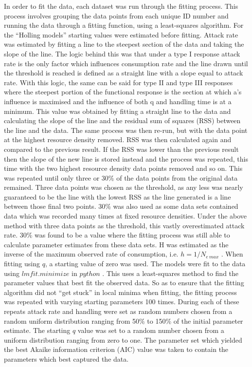 \documentclass[a4paper]{article}
\numberwithin{equation}{section}
\begin{document}
\newline
In order to fit the data, each dataset was run through the fitting process.  This process involves grouping the data points from each unique ID number and running the data through a fitting function, using a least-squares algorithm.  For the “Holling models” starting values were estimated before fitting. 
\newline 
Attack rate was estimated by fitting a line to the steepest section of the data and taking the slope of the line.  The logic behind this was that under a type I response attack rate is the only factor which influences consumption rate and the line drawn until the threshold is reached is defined as a straight line with a slope equal to attack rate.  With this logic, the same can be said for type II and type III responses where the steepest portion of the functional response is the section at which a’s influence is maximised and the influence of both q and handling time is at a minimum.  This value was obtained by fitting a straight line to the data and calculating the slope of the line and the residual sum of squares (RSS) between the line and the data.  The same process was then re-run, but with the data point at the highest resource density removed.  RSS was then calculated again and compared to the previous result.  If the RSS was lower than the previous result then the slope of the new line is stored instead and the process was repeated, this time with the two highest resource density data points removed and so on.  This was repeated until only three or 30\% of the data points from the original data remained.  Three data points was chosen as the threshold, as any less was nearly guaranteed to be the line with the lowest RSS as the line generated is a line between those final two points.  30\% was also used as some data sets contained data which was recorded many times at fixed resource densities.  Under the above method with three data points as the threshold, this vastly overestimated attack rate.  30\% was found to be a value where the fitting process was still able to calculate parameter estimates from these data sets.
\newline
H was estimated as the inverse of the maximum observed rate of consumption, i.e. $h = 1/N_{e \ max}$ \citep{Rosenbaum2018}.
\newline
When fitting using $q$, a starting value of zero was used. 
\newline 
The models were fit to the data using $lmfit.minimize$ in $python$ \citep{newville_matthew_2014_11813}.  This uses a least-squares method to find the parameter values that best fit the observed data.  So as to ensure that the fitting algorithm did not “get stuck” in local minima when fitting, the fitting process was repeated with varying starting parameters 100 times.  During each of these repeats attack rate and handling were set as random numbers chosen from a random uniform distribution ranging from 50\% to 150\% of the initial parameter estimate.  The starting $q$ value was set to a random number chosen from a uniform distribution ranging from zero to one.  The parameter set which yielded the best Akaike information criterion (AIC) value was taken to contain the parameters which best captured the data.  
\end{document}
